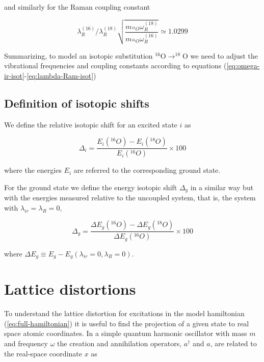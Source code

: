 \noindent and similarly for the Raman coupling constant

\begin{equation}
  \label{eq:lambda-Ram-isot}
  \lambda_R^{(16)} / \lambda_R^{(18)} \sqrt{\frac{m_{^{18}O}\omega_{R}^{(18)}}{m_{^{16}O}\omega_{R}^{(16)}}} \simeq 1.0299
\end{equation}

Summarizing, to model an isotopic substitution $^{16}$O$\rightarrow ^{18}$O we need to adjust the vibrational frequencies and coupling constants according to equations (\ref{eq:omega-ir-isot}-\ref{eq:lambda-Ram-isot})

\subsection{Definition of isotopic shifts}


We define the relative isotopic shift for an excited state $i$ as 

\begin{equation}
  \label{eq:isot-shift-def-exc}
  \Delta_i = \frac{E_i(^{16}O)- E_i(^{18}O)}{E_i(^{16}O)} \times 100
\end{equation}

\noindent where the energies $E_i$ are referred to the corresponding ground state.

For the ground state we define the energy isotopic shift $\Delta_g$ in a similar way but with the energies measured relative to the uncoupled system, that is, the system with $\lambda_{ir}=\lambda_R=0$,

\begin{equation}
  \label{eq:isot-shift-def-grd}
  \Delta_g = \frac{\Delta E_g(^{16}O)- \Delta E_g(^{18}O)}{\Delta E_g(^{16}O)} \times 100
\end{equation}

\noindent where $\Delta E_g \equiv E_g - E_g(\lambda_{ir}=0, \lambda_R=0)$.

\section{Lattice distortions}
\label{sec:lattice-distortions}

To understand the lattice distortion for excitations in the model hamiltonian (\ref{eq:full-hamiltonian}) it is useful to find the projection of a given state to real space atomic coordinates. 
In a simple quantum harmonic oscillator with mass $m$ and frequency $\omega$ the creation and annihilation operators, $a^\dagger$ and $a$, are related to the real-space coordinate $x$ as

